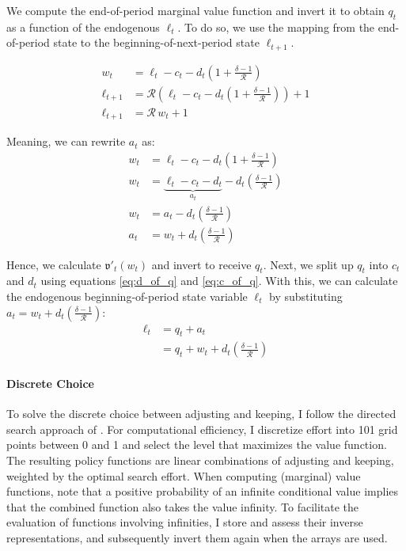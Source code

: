 \documentclass[\econtexMain]{subfiles}
\begin{document}
We compute the end-of-period marginal value function and invert it to obtain $q_t$ as a function of the endogenous $\ell_t$. To do so, we use the mapping from the end-of-period state to the beginning-of-next-period state $\ell_{t+1}$.

\begin{align}
	w_t &= \ell_t - c_t - d_t (1 + \frac{\delta - 1}{\mathcal{R}}) \\
	\ell_{t+1} &= \mathcal{R}(\ell_t - c_t - d_t (1 + \frac{\delta - 1}{\mathcal{R}})) + 1\\
	\ell_{t+1} &= \mathcal{R}\,w_t + 1 
\end{align}

Meaning, we can rewrite $a_t$ as:
\begin{align}
	w_t  &= \ell_t - c_t - d_t (1 + \frac{\delta - 1}{\mathcal{R}})\\
	w_t  &= \underbrace{\ell_t - c_t - d_t}_{a_t}  - d_t(\frac{\delta - 1}{\mathcal{R}})\\
	w_t  &= a_t - d_t (\frac{\delta - 1}{\mathcal{R}})\\
	a_t &= w_t + d_t (\frac{\delta - 1}{\mathcal{R}})
\end{align}

Hence, we calculate $\mathfrak{v}'_t(w_t)$ and invert to receive $q_t$. Next, we split up $q_t$ into $c_t$ and $d_t$ using equations \ref{eq:d_of_q} and \ref{eq:c_of_q}. With this, we can calculate the endogenous beginning-of-period state variable $\ell_t$ by substituting $a_t = w_t + d_t\left(\frac{\delta-1}{\mathcal{R}}\right)$:
\begin{align}
	\ell_t &= q_t + a_t\\
	&= q_t + w_t + d_t \left(\frac{\delta - 1}{\mathcal{R}}\right)
\end{align}




\paragraph{Discrete Choice}
To solve the discrete choice between adjusting and keeping, I follow the directed search approach of \cite{Khan2019-ew}. For computational efficiency, I discretize effort into 101 grid points between 0 and 1 and select the level that maximizes the value function. The resulting policy functions are linear combinations of adjusting and keeping, weighted by the optimal search effort. When computing (marginal) value functions, note that a positive probability of an infinite conditional value implies that the combined function also takes the value infinity. To facilitate the evaluation of functions involving infinities, I store and assess their inverse representations, and subsequently invert them again when the arrays are used.
	
\end{document}
